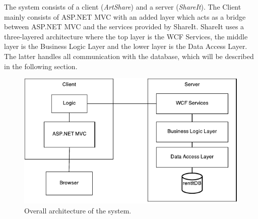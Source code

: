 \documentclass[../report.tex]{subfiles}
\begin{document}
\graphicspath{{img/}{../img/}}

The system consists of a client (\textit{ArtShare}) and a server (\textit{ShareIt}). 
The Client mainly consists of ASP.NET MVC with an added layer which acts as a bridge between ASP.NET MVC and the services provided by ShareIt. 
ShareIt uses a three-layered architecture where the top layer is the WCF Services, the middle layer is the Business Logic Layer and the lower layer is the Data Access Layer. The latter handles all communication with the database, which will be described in the following section.
\begin{figure}[H]
\centering
\includegraphics{overall_architecture.pdf}
\caption{Overall architecture of the system.}
\end{figure}
\end{document}
